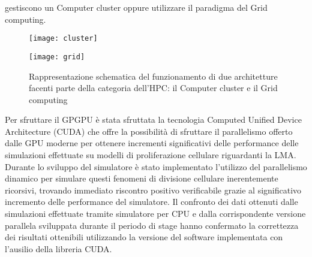 gestiscono un Computer cluster oppure utilizzare il paradigma del Grid 
computing.
\begin{figure}[t]
    \begin{minipage}[b]{.5\linewidth}
        \centering
        \texttt{[image: cluster]}
    \end{minipage}
    \begin{minipage}[b]{.5\linewidth}
        \centering
        \texttt{[image: grid]}
    \end{minipage}
    \caption{Rappresentazione schematica del funzionamento di due architetture 
        facenti parte della categoria dell'HPC: il Computer cluster e il 
        Grid computing}
    \label{fig:cluster-grid}
\end{figure}
Per sfruttare il GPGPU è stata sfruttata la tecnologia
Computed Unified Device Architecture (CUDA) che offre la possibilità di 
sfruttare il parallelismo offerto dalle GPU moderne per ottenere incrementi 
significativi delle performance delle simulazioni effettuate su modelli di 
proliferazione cellulare riguardanti la LMA.
Durante lo sviluppo del simulatore è stato implementato l'utilizzo del 
parallelismo dinamico per simulare questi fenomeni 
di divisione cellulare inerentemente ricorsivi, trovando immediato riscontro 
positivo verificabile grazie al significativo incremento delle performance 
del simulatore. Il confronto dei dati ottenuti dalle simulazioni effettuate
tramite simulatore per CPU e dalla corrispondente versione parallela 
sviluppata durante il periodo di stage hanno confermato la correttezza dei
risultati ottenibili utilizzando la versione del software implementata con
l'ausilio della libreria CUDA.
